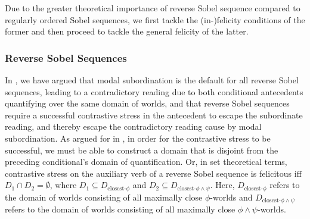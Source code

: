 \begin{table}[!htb]
\end{table}

\noindent Due to the greater theoretical importance of reverse Sobel sequence compared to regularly ordered Sobel sequences, we first tackle the (in-)felicity conditions of the former and then proceed to tackle the general felicity of the latter.

\subsubsection{Reverse Sobel Sequences}
In , we have argued that modal subordination is the default for all reverse Sobel sequences, leading to a contradictory reading due to both conditional antecedents quantifying over the same domain of worlds, and that reverse Sobel sequences require a successful contrastive stress in the antecedent to escape the subordinate reading, and thereby escape the contradictory reading cause by modal subordination. As argued for in , in order for the contrastive stress to be successful, we must be able to construct a domain that is disjoint from the preceding conditional's domain of quantification. Or, in set theoretical terms, contrastive stress on the auxiliary verb of a reverse Sobel sequence is felicitous iff $D_1\cap D_2=\emptyset$, where $D_1\subseteq D_{\text{closest-}\phi}$ and $D_2\subseteq D_{\text{closest-}\phi\land\psi}$. Here, $D_{\text{closest-}\phi}$ refers to the domain of worlds consisting of all maximally close $\phi$-worlds and $D_{\text{closest-}\phi\land\psi}$ refers to the domain of worlds consisting of all maximally close $\phi\land\psi$-worlds.

